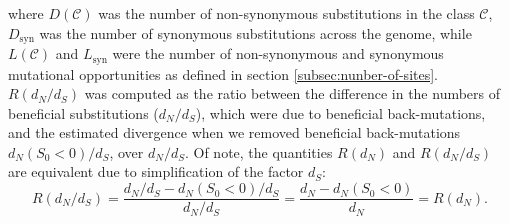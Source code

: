\documentclass{article}
\newcommand{\dn}{d_N}
\newcommand{\ds}{d_S}
\newcommand{\dnds}{\dn / \ds}
\newcommand{\Sphy}{S_{0}}
\newcommand{\Sphyclass}{\mathcal{C}}
\begin{document}
    where $D \left( \Sphyclass \right) $ was the number of non-synonymous substitutions in the class $\Sphyclass$, $D_{\text{syn}}$ was the number of synonymous substitutions across the genome, while $L \left( \Sphyclass \right)$ and $L_{\text{syn}}$ were the number of non-synonymous and synonymous mutational opportunities as defined in section \ref{subsec:nunber-of-sites}.
    $R(\dnds)$ was computed as the ratio between the difference in the numbers of beneficial substitutions ($\dnds$), which were due to beneficial back-mutations, and the estimated divergence when we removed beneficial back-mutations $\dn (\Sphy < 0) / \ds$, over $\dnds$.
    Of note, the quantities $R(\dn)$ and $R(\dnds)$ are equivalent due to simplification of the factor $\ds$:
    \begin{equation}
        R(\dnds) = \dfrac{\dnds - \dn(\Sphy < 0) / \ds}{\dnds} = \dfrac{\dn - \dn(\Sphy < 0)}{\dn} = R(\dn).
    \end{equation}
\end{document}
